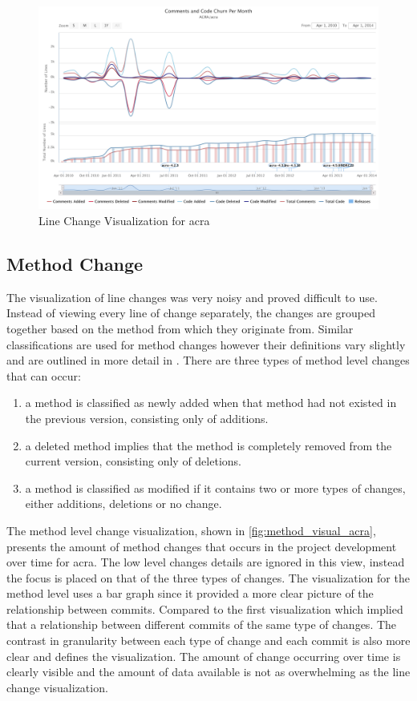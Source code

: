 \begin{landscape}
 \thispagestyle{empty}
 \begin{figure}
  \centering
        \includegraphics[width=1.5\textwidth]{images/lines_visual_acra}
    \caption{Line Change Visualization for acra}
    \label{fig:line_visual_acra}
 \end{figure}
\end{landscape}
\pagestyle{plain}

\subsection{Method Change}

The visualization of line changes was very noisy and proved difficult to use. Instead of viewing every line of change separately, the changes are grouped together based on the method from which they originate from. Similar classifications are used for method changes however their definitions vary slightly and are outlined in more detail in . There are three types of method level changes that can occur:
\begin{enumerate}
\item a method is classified as newly added when that method had not existed in the previous version, consisting only of additions.
\item a deleted method implies that the method is completely removed from the current version, consisting only of deletions.
\item a method is classified as modified if it contains two or more types of changes, either additions, deletions or no change.
\end{enumerate}
The method level change visualization, shown in \autoref{fig:method_visual_acra}, presents the amount of method changes that occurs in the project development over time for acra. The low level changes details are ignored in this view, instead the focus is placed on that of the three types of changes. The visualization for the method level uses a bar graph since it provided a more clear picture of the relationship between commits. Compared to the first visualization which implied that a relationship between different commits of the same type of changes. The contrast in granularity between each type of change and each commit is also more clear and defines the visualization. The amount of change occurring over time is clearly visible and the amount of data available is not as overwhelming as the line change visualization.

